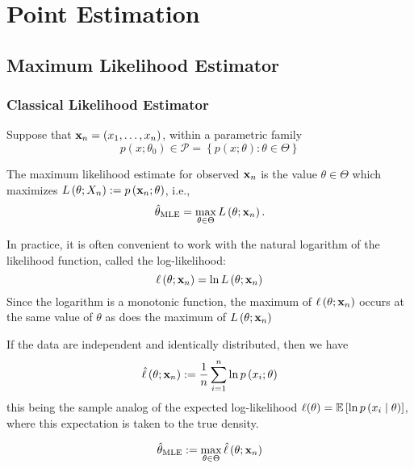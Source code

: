 \chapter{Point Estimation}

\section{Maximum Likelihood Estimator}

\subsection{Classical Likelihood Estimator}

Suppose that ${\bf x}_{n}=\left(x_{1},\ldots,x_{n}\right)$, within a parametric family
\begin{equation}
	p\left(x;\theta_{0}\right)\in\mathcal{P}=\left\{p(x;\theta):\theta\in\Theta\right\}
\end{equation}

The maximum likelihood estimate for observed ${\bf x}_{n}$ is the value $\theta\in\Theta$ which maximizes $L\left(\theta;X_{n}\right):=p\left({\bf x}_{n};\theta\right)$, i.e.,
\begin{equation}
	\hat{\theta}_{\text{MLE}}=\max_{\theta\in\Theta}L\left(\theta;{\bf x}_{n}\right).
\end{equation}

In practice, it is often convenient to work with the natural logarithm of the likelihood function, called the log-likelihood:
\begin{equation}
	\ell\left(\theta;{\bf x}_{n}\right)=\ln L\left(\theta;{\bf x}_{n}\right)
\end{equation}
Since the logarithm is a monotonic function, the maximum of $\ell\left(\theta;{\bf x}_{n}\right)$ occurs at the same value of $\theta$ as does the maximum of $L\left(\theta;{\bf x}_{n}\right)$

If the data are independent and identically distributed, then we have
\begin{equation}
	\hat{\ell}\left(\theta;{\bf x}_{n}\right):=\frac{1}{n}\sum_{i=1}^{n}\ln p\left(x_{i};\theta\right)
\end{equation}
this being the sample analog of the expected log-likelihood $\ell(\theta)={\mathbb E}\left[\ln p\left(x_{i} \mid \theta\right)\right]$, where this expectation is taken to the true density.

\begin{equation}
	\hat{\theta}_{\text{MLE}}:=\max_{\theta\in\Theta}\hat{\ell}\left(\theta;{\bf x}_{n}\right)
\end{equation}

